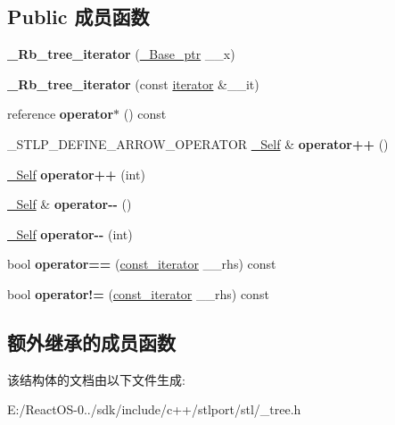 \subsection*{Public 成员函数}
\begin{DoxyCompactItemize}
\item 
\mbox{\label{struct___rb__tree__iterator_a845001295e57624d9ee78c9c02df0c7b}} 
{\bfseries \+\_\+\+Rb\+\_\+tree\+\_\+iterator} (\hyperlink{struct___rb__tree__node__base}{\+\_\+\+Base\+\_\+ptr} \+\_\+\+\_\+x)
\item 
\mbox{\label{struct___rb__tree__iterator_adf973f4fffa03a5fd41e8670a049552e}} 
{\bfseries \+\_\+\+Rb\+\_\+tree\+\_\+iterator} (const \hyperlink{struct___rb__tree__iterator}{iterator} \&\+\_\+\+\_\+it)
\item 
\mbox{\label{struct___rb__tree__iterator_a226261bc41c705fb72b483287e371897}} 
reference {\bfseries operator$\ast$} () const
\item 
\mbox{\label{struct___rb__tree__iterator_a1a027847badfdccbe7b66f41b1b44d72}} 
\+\_\+\+S\+T\+L\+P\+\_\+\+D\+E\+F\+I\+N\+E\+\_\+\+A\+R\+R\+O\+W\+\_\+\+O\+P\+E\+R\+A\+T\+OR \hyperlink{struct___rb__tree__iterator}{\+\_\+\+Self} \& {\bfseries operator++} ()
\item 
\mbox{\label{struct___rb__tree__iterator_a5fed76775c1c397ff7a3573f118a34f5}} 
\hyperlink{struct___rb__tree__iterator}{\+\_\+\+Self} {\bfseries operator++} (int)
\item 
\mbox{\label{struct___rb__tree__iterator_a942e9bc0e374cd43d57888c5f21b37ae}} 
\hyperlink{struct___rb__tree__iterator}{\+\_\+\+Self} \& {\bfseries operator-\/-\/} ()
\item 
\mbox{\label{struct___rb__tree__iterator_a3569ebdd3fa46f160adcf878edb16151}} 
\hyperlink{struct___rb__tree__iterator}{\+\_\+\+Self} {\bfseries operator-\/-\/} (int)
\item 
\mbox{\label{struct___rb__tree__iterator_ac9b7ee3e67705c6c4d753f87688db06a}} 
bool {\bfseries operator==} (\hyperlink{struct___rb__tree__iterator}{const\+\_\+iterator} \+\_\+\+\_\+rhs) const
\item 
\mbox{\label{struct___rb__tree__iterator_a0496c41148b5bb41eeffe6db288568b0}} 
bool {\bfseries operator!=} (\hyperlink{struct___rb__tree__iterator}{const\+\_\+iterator} \+\_\+\+\_\+rhs) const
\end{DoxyCompactItemize}
\subsection*{额外继承的成员函数}


该结构体的文档由以下文件生成\+:\begin{DoxyCompactItemize}
\item 
E\+:/\+React\+O\+S-\/0../sdk/include/c++/stlport/stl/\+\_\+tree.\+h\end{DoxyCompactItemize}
